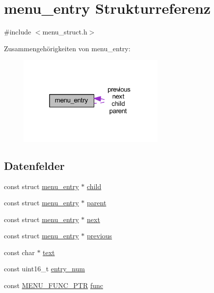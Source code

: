 \hypertarget{structmenu__entry}{}\section{menu\+\_\+entry Strukturreferenz}
\label{structmenu__entry}


{\ttfamily \#include $<$menu\+\_\+struct.\+h$>$}



Zusammengehörigkeiten von menu\+\_\+entry\+:\nopagebreak
\begin{figure}[H]
\begin{center}
\leavevmode
\includegraphics[width=205pt]{structmenu__entry__coll__graph}
\end{center}
\end{figure}
\subsection*{Datenfelder}
\begin{DoxyCompactItemize}
\item 
const struct \hyperlink{structmenu__entry}{menu\+\_\+entry} $\ast$ \hyperlink{structmenu__entry_afb8f7c977abd9b84c48a00c204aad77b}{child}
\item 
const struct \hyperlink{structmenu__entry}{menu\+\_\+entry} $\ast$ \hyperlink{structmenu__entry_ac1b562fabcc9402003931e8351d6faf7}{parent}
\item 
const struct \hyperlink{structmenu__entry}{menu\+\_\+entry} $\ast$ \hyperlink{structmenu__entry_a8667330bb5cb56772e88abd901064211}{next}
\item 
const struct \hyperlink{structmenu__entry}{menu\+\_\+entry} $\ast$ \hyperlink{structmenu__entry_a66676e2c3f7553b50a8c1d0c4e973734}{previous}
\item 
const char $\ast$ \hyperlink{structmenu__entry_a16343090e80c4472521560f30113d96c}{text}
\item 
const uint16\+\_\+t \hyperlink{structmenu__entry_aead51ebe631627145d52a84b2d92e240}{entry\+\_\+num}
\item 
const \hyperlink{menu__struct_8h_a24061d6de983538c9c60c1ec65b4cbb1}{M\+E\+N\+U\+\_\+\+F\+U\+N\+C\+\_\+\+P\+T\+R} \hyperlink{structmenu__entry_a365388f9c041d9cc19cb73e599ece1d6}{func}
\end{DoxyCompactItemize}



